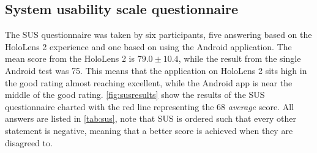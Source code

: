 \subsection{System usability scale questionnaire}
 
The SUS questionnaire was taken by six participants, five answering based on the HoloLens 2 experience and one based on using the Android application. The mean score from the HoloLens 2 is $79.0 \pm 10.4$, while the result from the single Android test was 75. This means that the application on HoloLens 2 sits high in the good rating almost reaching excellent, while the Android app is near the middle of the good rating. \autoref{fig:susresults} show the results of the SUS questionnaire charted with the red line representing the 68 \textit{average} score. All answers are listed in \autoref{tab:sus}, note that SUS is ordered such that every other statement is negative, meaning that a better score is achieved when they are disagreed to.

